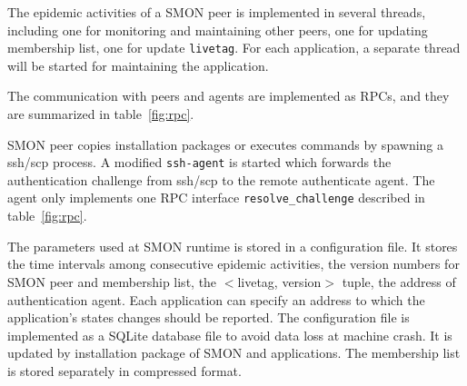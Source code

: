 The epidemic activities of a SMON peer is implemented in
several
threads, including one for monitoring and maintaining other
peers, one for updating membership list, one for update
\texttt{livetag}. For each application, a separate thread
will be started for maintaining the application.

The communication with peers and agents are implemented as
RPCs, and they are summarized in table~\ref{fig:rpc}.


SMON peer copies installation packages or executes commands
by spawning a ssh/scp process. A modified \texttt{ssh-agent}
is started which forwards the authentication challenge from
ssh/scp to the remote authenticate agent. The agent only
implements one RPC interface \texttt{resolve\_challenge}
described in table~\ref{fig:rpc}.

The parameters used at SMON runtime is stored in a
configuration file. It stores the time intervals among
consecutive epidemic activities, the version numbers for
SMON peer and membership list, the $<$livetag, version$>$
tuple, the address of authentication agent. Each application
can specify an address to which the application's states
changes should be reported. The configuration file is
implemented as a SQLite database file to avoid data loss at
machine crash. It is updated by
installation package of SMON and applications.  The
membership list is stored separately in compressed format.



